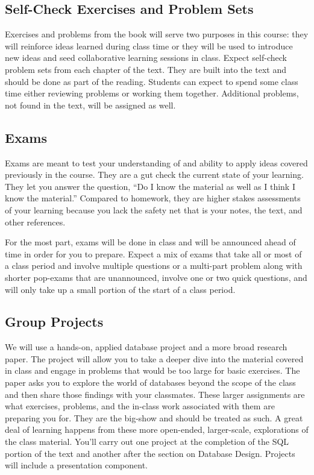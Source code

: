 \documentclass[10pt]{article}
\begin{document}
\subsection*{Self-Check Exercises and Problem Sets}

Exercises and problems from the book will serve two purposes in this course: they will reinforce ideas learned during class time or they will be used to introduce new ideas and seed collaborative learning sessions in class.  Expect self-check problem sets from each chapter of the text. They are built into the text and should be done as part of the reading. Students can expect to spend some class time either reviewing problems or working them together. Additional problems, not found in the text, will be assigned as well. 

\subsection*{Exams}

Exams are meant to test your understanding of and ability to apply ideas covered previously in the course. They are a gut check the current state of your learning. They let you answer the question, ``Do I know the material as well as I think I know the material.''  Compared to homework, they are higher stakes assessments of your learning because you lack the safety net that is your notes, the text, and other references.

For the most part, exams will be done in class and will be announced ahead of time in order for you to prepare.  Expect a mix of exams that take all or most of a class period and involve multiple questions or a multi-part problem along with shorter pop-exams that are unannounced, involve one or two quick questions, and will only take up a small portion of the start of a class period.

\subsection*{Group Projects}

We will use a hands-on, applied database project and a more broad research paper. The project will allow you to take a deeper dive into the material covered in class and engage in problems that would be too large for basic exercises.  The paper asks you to explore the world of databases beyond the scope of the class and then share those findings with your classmates. These larger assignments are what exercises, problems, and the in-class work associated with them are preparing you for.  They are the big-show and should be treated as such. A great deal of learning happens from these more open-ended, larger-scale, explorations of the class material. You'll carry out one project at the completion of the SQL portion of the text and another after the section on Database Design. Projects will include a presentation component. 
\end{document}
